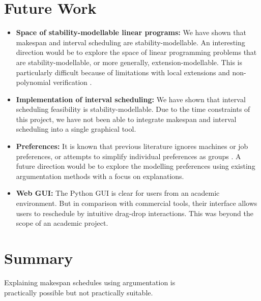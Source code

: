 \section{Future Work}

\begin{itemize}
	\item\textbf{Space of stability-modellable linear programs:} We have shown that makespan and interval scheduling are stability-modellable. An interesting direction would be to explore the space of linear programming problems that are stability-modellable, or more generally, extension-modellable. This is particularly difficult because of limitations with local extensions and non-polynomial verification \cite{aes}.
	\item\textbf{Implementation of interval scheduling:} We have shown that interval scheduling feasibility is stability-modellable. Due to the time constraints of this project, we have not been able to integrate makespan and interval scheduling into a single graphical tool.
	\item\textbf{Preferences:} It is known that previous literature ignores machines or job preferences, or attempts to simplify individual preferences as groups \cite{preferences}. A future direction would be to explore the modelling preferences using existing argumentation methods \cite{acceptability, aba} with a focus on explanations.
	\item\textbf{Web GUI:} The Python GUI is clear for users from an academic environment. But in comparison with commercial tools, their interface allows users to reschedule by intuitive drag-drop interactions. This was beyond the scope of an academic project.
\end{itemize}

\section{Summary}

\begin{framed}
	\centering
	Explaining makespan schedules using argumentation is\\practically
	possible but not practically suitable.
\end{framed}